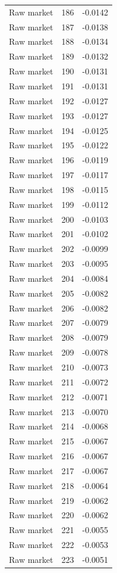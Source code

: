 \begin{table}[htbp]
\begin{tabular}{lll}
Raw market & 186 & -0.0142 \\
Raw market & 187 & -0.0138 \\
Raw market & 188 & -0.0134 \\
Raw market & 189 & -0.0132 \\
Raw market & 190 & -0.0131 \\
Raw market & 191 & -0.0131 \\
Raw market & 192 & -0.0127 \\
Raw market & 193 & -0.0127 \\
Raw market & 194 & -0.0125 \\
Raw market & 195 & -0.0122 \\
Raw market & 196 & -0.0119 \\
Raw market & 197 & -0.0117 \\
Raw market & 198 & -0.0115 \\
Raw market & 199 & -0.0112 \\
Raw market & 200 & -0.0103 \\
Raw market & 201 & -0.0102 \\
Raw market & 202 & -0.0099 \\
Raw market & 203 & -0.0095 \\
Raw market & 204 & -0.0084 \\
Raw market & 205 & -0.0082 \\
Raw market & 206 & -0.0082 \\
Raw market & 207 & -0.0079 \\
Raw market & 208 & -0.0079 \\
Raw market & 209 & -0.0078 \\
Raw market & 210 & -0.0073 \\
Raw market & 211 & -0.0072 \\
Raw market & 212 & -0.0071 \\
Raw market & 213 & -0.0070 \\
Raw market & 214 & -0.0068 \\
Raw market & 215 & -0.0067 \\
Raw market & 216 & -0.0067 \\
Raw market & 217 & -0.0067 \\
Raw market & 218 & -0.0064 \\
Raw market & 219 & -0.0062 \\
Raw market & 220 & -0.0062 \\
Raw market & 221 & -0.0055 \\
Raw market & 222 & -0.0053 \\
Raw market & 223 & -0.0051 \\

\end{tabular}
\end{table}

